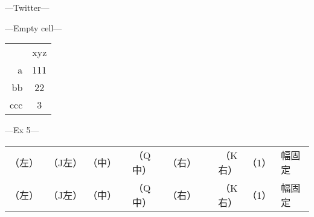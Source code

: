 \documentclass{article}
\begin{document}
---Twitter---


---Empty cell---

\begin{tabular}{|r|c|}
& xyz \\
a & 111 \\
bb & 22 \\
ccc & 3
\end{tabular}

---Ex 5---

\ifx\kanjiskip\undefined\else
%
\makeatletter
{}
\makeatother
\begin{tabular}{|l|J|c|Q|r|K|Y|p{2cm}|}
（左）&（J左）&（中）&（Q中）&（右）&（K右）&（1）&幅固定\\
（左） & （J左） & （中） & （Q中） & （右） & （K右） & （1） & 幅固定 \\
\end{tabular}
%
\fi
\end{document}
